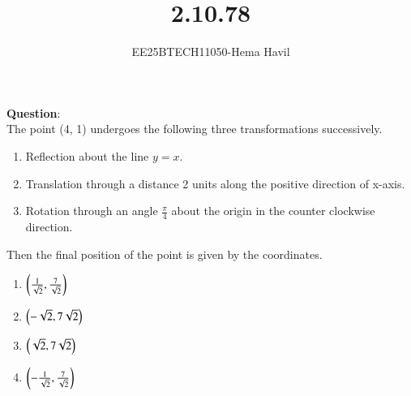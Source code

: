 \documentclass[journal]{IEEEtran}
\begin{document}

\vspace{3cm}
\title{2.10.78}
\author{EE25BTECH11050-Hema Havil}
	\maketitle
	{\let\newpage\relax\maketitle}
	
	\renewcommand{\thefigure}{\theenumi}
	\renewcommand{\thetable}{\theenumi}
	\setlength{\intextsep}{12pt} %
	
	\renewcommand{\thetable}{\theenumi}
	
	\textbf{Question}:\\
    
         The point (4, 1) undergoes the following three transformations successively.
         \begin{enumerate}[label=(\alph*)]
             \item Reflection about the line $y = x$.
             \item Translation through a distance 2 units along the positive direction of x-axis.
             \item Rotation through an angle $\frac{\pi}{4}$ about the origin in the counter clockwise direction.
         \end{enumerate}
         Then the final position of the point is given by the coordinates.
         \begin{multicols}{4}
             \begin{enumerate}[label=(\alph*)]
                \item $\left(\frac{1}{\sqrt{2}},\frac{7}{\sqrt{2}}\right)$
                \item $\left(-\sqrt{2},7\sqrt{2}\right)$
                \item $\left(\sqrt{2},7\sqrt{2}\right)$
                \item $\left(-\frac{1}{\sqrt{2}},\frac{7}{\sqrt{2}}\right)$
             \end{enumerate}
         \end{multicols}
         
\end{document}
